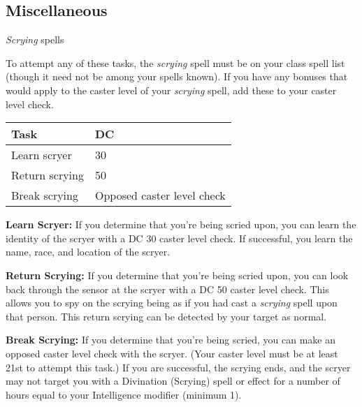 \documentclass{article}
\begin{document}
\vspace{12pt}
\subsection*{{\LARGE{}Miscellaneous}}

\textit{Scrying} spells

To attempt any of these tasks, the \textit{scrying }spell must be on your class 
spell list (though it need not be among your spells known). If you have any bonuses 
that would apply to the caster level of your \textit{scrying }spell, add these 
to your caster level check.

\begin{tabular}{|>{\raggedright}p{58pt}|>{\raggedright}p{107pt}|}
\hline
T\textbf{ask} & D\textbf{C }\tabularnewline
\hline
Learn scryer  & 30\tabularnewline
\hline
Return scrying  & 50 \tabularnewline
\hline
Break scrying  & Opposed caster level check \tabularnewline
\hline
\end{tabular}

\textbf{Learn Scryer: }If you determine that you're being scried upon, you can 
learn the identity of the scryer with a DC 30 caster level check. If successful, 
you learn the name, race, and location of the scryer. 

\textbf{Return Scrying: }If you determine that you're being scried upon, you can 
look back through the sensor at the scryer with a DC 50 caster level check. This 
allows you to spy on the scrying being as if you had cast a \textit{scrying }spell 
upon that person. This return scrying can be detected by your target as normal.

\textbf{Break Scrying: }If you determine that you're being scried, you can make 
an opposed caster level check with the scryer. (Your caster level must be at least 
21st to attempt this task.) If you are successful, the scrying ends, and the scryer 
may not target you with a Divination (Scrying) spell or effect for a number of 
hours equal to your Intelligence modifier (minimum 1).

\newpage
\end{document}
